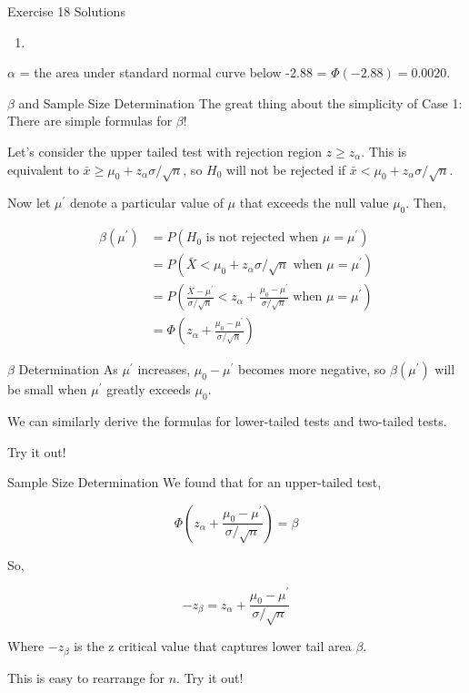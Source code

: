\documentclass[
  ignorenonframetext,
]{beamer}
\providecommand{\tightlist}{%
  \setlength{\itemsep}{0pt}\setlength{\parskip}{0pt}}\usepackage{longtable,booktabs,array}
\begin{document}
\begin{frame}{Exercise 18 Solutions}
\protect\hypertarget{exercise-18-solutions-2}{}
\begin{enumerate}[<+->]
[a.]
\setcounter{enumi}{2}
\tightlist
\item
\end{enumerate}

\(\alpha\) = the area under standard normal curve below -2.88 =
\(\Phi(-2.88) = 0.0020\).
\end{frame}

\begin{frame}{\(\beta\) and Sample Size Determination}
\protect\hypertarget{beta-and-sample-size-determination}{}
The great thing about the simplicity of Case 1: There are simple
formulas for \(\beta\)!

Let's consider the upper tailed test with rejection region
\(z \geq z_{\alpha}\). This is equivalent to
\(\bar{x} \geq \mu_{0} + z_{\alpha}\sigma/\sqrt{n}\), so \(H_{0}\) will
not be rejected if \(\bar{x} < \mu_{0} + z_{\alpha}\sigma/\sqrt{n}\).

Now let \(\mu^{\prime}\) denote a particular value of \(\mu\) that
exceeds the null value \(\mu_{0}\). Then,

\[
\begin{aligned}
\beta(\mu^{\prime}) &= P(H_{0} \text{ is not rejected when } \mu = \mu^{\prime}) \\
&= P(\bar{X} < \mu_{0} + z_{\alpha}\sigma/\sqrt{n} \text{ when } \mu=\mu^{\prime}) \\
&= P\left( \frac{\bar{X} - \mu^{\prime}}{\sigma/\sqrt{n}} < z_{\alpha} + \frac{\mu_{0} - \mu^{\prime}}{\sigma/\sqrt{n}} \text{ when } \mu = \mu^{\prime}\right) \\
&= \Phi\left(z_{\alpha} + \frac{\mu_{0} - \mu^{\prime}}{\sigma/\sqrt{n}} \right)
\end{aligned}
\]
\end{frame}

\begin{frame}{\(\beta\) Determination}
\protect\hypertarget{beta-determination}{}
As \(\mu^{\prime}\) increases, \(\mu_{0} - \mu^{\prime}\) becomes more
negative, so \(\beta(\mu^{\prime})\) will be small when \(\mu^{\prime}\)
greatly exceeds \(\mu_{0}\).

We can similarly derive the formulas for lower-tailed tests and
two-tailed tests.

Try it out!
\end{frame}

\begin{frame}{Sample Size Determination}
\protect\hypertarget{sample-size-determination}{}
We found that for an upper-tailed test,

\[
\Phi\left(z_{\alpha} +  \frac{\mu_{0} - \mu^{\prime}}{\sigma/\sqrt{n}} \right) = \beta
\]

So,

\[
- z_{\beta} = z_{\alpha} +  \frac{\mu_{0} - \mu^{\prime}}{\sigma/\sqrt{n}}
\]

Where \(-z_{\beta}\) is the z critical value that captures lower tail
area \(\beta\).

This is easy to rearrange for \(n\). Try it out!
\end{frame}
\end{document}
